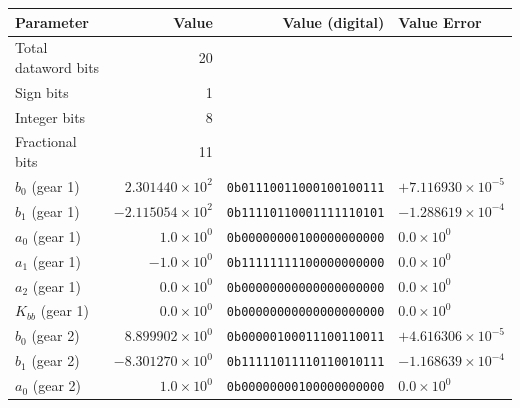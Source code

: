 		\begin{table}[h!]
			\centering
			\def\arraystretch{1.5}		
			\setlength\arrayrulewidth{0.75pt}
			\setlength{\tabcolsep}{1em} %
			\begin{tabular}{|l|r|r|l|}
				\hline 
				\rule[-1ex]{0pt}{2.5ex} \cellcolor{gray!40}\textbf{Parameter} & \cellcolor{gray!40}\textbf{Value} & \cellcolor{gray!40}\textbf{Value (digital) } & \cellcolor{gray!40}\textbf{Value Error}\\ 
				\hline 
				\rule[-1ex]{0pt}{2.5ex} Total dataword bits  & 20 & & \\ 
				\hline 
				\rule[-1ex]{0pt}{2.5ex} Sign bits  & 1 & & \\ 
				\hline 
				\rule[-1ex]{0pt}{2.5ex} Integer bits & 8 & & \\ 
				\hline 
				\rule[-1ex]{0pt}{2.5ex} Fractional bits  & 11 & & \\ 
				\hline 
				\rule[-1ex]{0pt}{2.5ex} \textbf{$b_0$} {\color{red} (gear 1)} & $2.301440\times10^2$ & \texttt{0b01110011000100100111}  & $+7.116930\times10^{-5}$\\
				\hline 
				\rule[-1ex]{0pt}{2.5ex} \textbf{$b_1$} {\color{red} (gear 1)} & $-2.115054\times10^2$ & \texttt{0b11110110001111110101}  & $-1.288619\times10^{-4}$\\
				\hline 
				\rule[-1ex]{0pt}{2.5ex} \textbf{$a_0$} {\color{red} (gear 1)} & $1.0\times10^0$ & \texttt{0b00000000100000000000} & $0.0\times10^0$ \\ 
				\hline 
				\rule[-1ex]{0pt}{2.5ex} \textbf{$a_1$} {\color{red} (gear 1)} & $-1.0\times10^0$ & \texttt{0b11111111100000000000} & $0.0\times10^0$ \\ 
				\hline 
				\rule[-1ex]{0pt}{2.5ex} \textbf{$a_2$} {\color{red} (gear 1)} & $0.0\times10^0$ & \texttt{0b00000000000000000000} & $0.0\times10^0$ \\ 
				\hline 
				\rule[-1ex]{0pt}{2.5ex} \textbf{$K_{bb}$} {\color{red} (gear 1)} & $0.0\times10^0$ & \texttt{0b00000000000000000000} & $0.0\times10^0$ \\ 
				\hline 
				\rule[-1ex]{0pt}{2.5ex} \textbf{$b_0$} {\color{blue} (gear 2)} & $8.899902\times10^0$ & \texttt{0b00000100011100110011}  & $+4.616306\times10^{-5}$\\
				\hline 
				\rule[-1ex]{0pt}{2.5ex} \textbf{$b_1$} {\color{blue} (gear 2)} & $-8.301270\times10^0$ & \texttt{0b11111011110110010111}  & $-1.168639\times10^{-4}$\\
				\hline 
				\rule[-1ex]{0pt}{2.5ex} \textbf{$a_0$} {\color{blue} (gear 2)} & $1.0\times10^0$ & \texttt{0b00000000100000000000} & $0.0\times10^0$ \\ 

\end{tabular}
\end{table}
